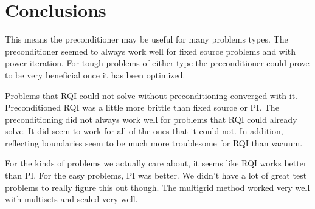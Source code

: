 
\chapter{Conclusions}
\label{sec:Chp5}

This means the preconditioner may be useful for many problems types. The preconditioner seemed to always work well for fixed source problems and with power iteration. For tough problems of either type the preconditioner could prove to be very beneficial once it has been optimized.  

Problems that RQI could not solve without preconditioning converged with it. Preconditioned RQI was a little more brittle than fixed source or PI. The preconditioning did not always work well for problems that RQI could already solve. It did seem to work for all of the ones that it could not. In addition, reflecting boundaries seem to be much more troublesome for RQI than vacuum. 

For the kinds of problems we actually care about, it seems like RQI works better than PI. For the easy problems, PI was better. We didn't have a lot of great test problems to really figure this out though. The multigrid method worked very well with multisets and scaled very well. 





